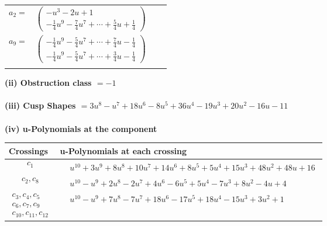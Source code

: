 \documentclass[1p]{elsarticle_modified}
\theoremstyle{definition}
\begin{document}
\begin{tabular}{m{7pt} m{180pt} m{7pt} m{180pt} }
\flushright $a_{2}=$&$\begin{pmatrix}- u^3-2 u+1\\-\frac{1}{4} u^9-\frac{7}{4} u^7+\cdots+\frac{5}{4} u+\frac{1}{4}\end{pmatrix}$ \\
\flushright $a_{9}=$&$\begin{pmatrix}-\frac{1}{4} u^9-\frac{5}{4} u^7+\cdots+\frac{7}{4} u-\frac{1}{4}\\-\frac{1}{4} u^9-\frac{5}{4} u^7+\cdots+\frac{3}{4} u-\frac{1}{4}\end{pmatrix}$\\&\end{tabular}
\flushleft \textbf{(ii) Obstruction class $= -1$}\\~\\
\flushleft \textbf{(iii) Cusp Shapes $= 3 u^8- u^7+18 u^6-8 u^5+36 u^4-19 u^3+20 u^2-16 u-11$}\\~\\
\newpage\renewcommand{\arraystretch}{1}
\flushleft \textbf{(iv) u-Polynomials at the component}\newline \\
\begin{tabular}{m{50pt}|m{274pt}}
Crossings & \hspace{64pt}u-Polynomials at each crossing \\
\hline $$\begin{aligned}c_{1}\end{aligned}$$&$\begin{aligned}
&u^{10}+3 u^9+8 u^8+10 u^7+14 u^6+8 u^5+5 u^4+15 u^3+48 u^2+48 u+16
\end{aligned}$\\
\hline $$\begin{aligned}c_{2},c_{8}\end{aligned}$$&$\begin{aligned}
&u^{10}- u^9+2 u^8-2 u^7+4 u^6-6 u^5+5 u^4-7 u^3+8 u^2-4 u+4
\end{aligned}$\\
\hline $$\begin{aligned}c_{3},c_{4},c_{5}\\c_{6},c_{7},c_{9}\\c_{10},c_{11},c_{12}\end{aligned}$$&$\begin{aligned}
&u^{10}- u^9+7 u^8-7 u^7+18 u^6-17 u^5+18 u^4-15 u^3+3 u^2+1
\end{aligned}$\\
\hline
\end{tabular}\\~\\
\end{document}
